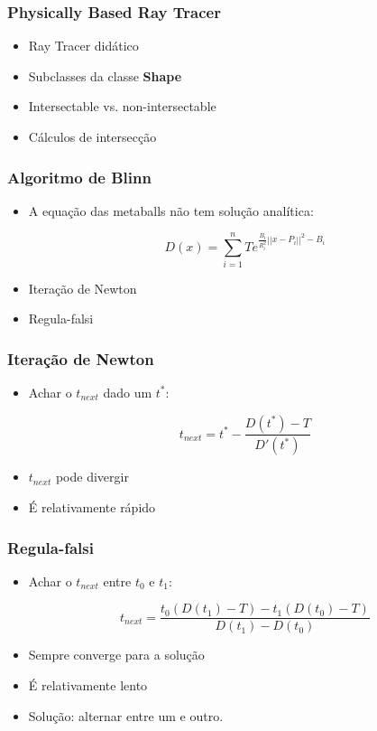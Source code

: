 \documentclass[brazil]{beamer}
\begin{document}
    \begin{frame}
      \frametitle{Physically Based Ray Tracer}
      \begin{itemize}
        \item Ray Tracer didático
        \item Subclasses da classe \textbf{Shape}
        \item Intersectable vs. non-intersectable
        \item Cálculos de intersecção
      \end{itemize}
    \end{frame}    

    \begin{frame}
      \frametitle{Algoritmo de Blinn}
      \begin{itemize}
        \item A equação das metaballs não tem solução analítica:
          \vspace{-1.0em}
          \begin{center}
            $$D(x) = \sum_{i = 1}^n Te^{\frac{B_i}{R_i^2}||x-P_i||^2-B_i} $$
          \end{center}
          \vspace{.5em}
        \item Iteração de Newton
        \item Regula-falsi
      \end{itemize}
    \end{frame}

    \begin{frame}
      \frametitle{Iteração de Newton}
      \begin{itemize}
        \item Achar o $t_{next}$ dado um $t^*$:
          \vspace{0.5em}
          \begin{center}
            $$ t_{next} = t^* - \frac{D(t^*) - T}{D'(t^*)} $$
          \end{center}        
        \item $t_{next}$ pode divergir
        \item É relativamente rápido
      \end{itemize}
    \end{frame}

    \begin{frame}
      \frametitle{Regula-falsi}
      \begin{itemize}
        \item Achar o $t_{next}$ entre $t_0$ e $t_1$:
          \vspace{0.5em}
          \begin{center}
            $$ t_{next} = \frac{t_0(D(t_1) - T) - t_1(D(t_0) - T)}{D(t_1) - D(t_0)} $$
          \end{center}        
        \item Sempre converge para a solução
        \item É relativamente lento
        \item Solução: alternar entre um e outro.
      \end{itemize}
    \end{frame}    
\end{document}
